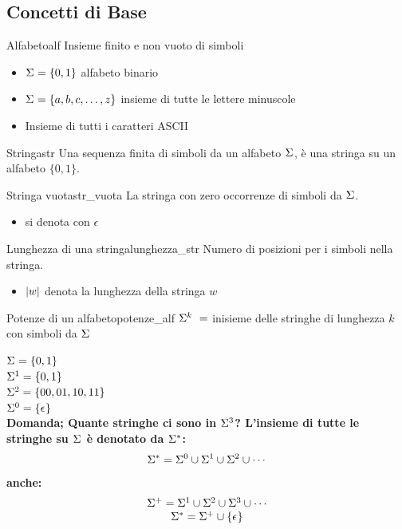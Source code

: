 \documentclass[11pt, a4paper]{article}
\begin{document}
\subsection{Concetti di Base}\label{sub:concetti_di_base} %
\begin{definition}{Alfabeto}{alf}
    Insieme finito e non vuoto di simboli
    \begin{itemize}
        \item $\Si = \{0, 1\}$ alfabeto binario
        \item $\Si = \{a, b, c, \dots, z\}$ insieme di tutte le lettere minuscole
        \item Insieme di tutti i caratteri ASCII
    \end{itemize}
\end{definition}
%
\begin{definition}{Stringa}{str}
    Una sequenza finita di simboli da un alfabeto $\Si$, è una stringa su un alfabeto $\{0, 1\}$.
\end{definition}
%
\begin{definition}{Stringa vuota}{str_vuota}
    La stringa con zero occorrenze di simboli da $\Si$.
    \begin{itemize}
        \item si denota con $\eps$
    \end{itemize}
\end{definition}
%
\begin{definition}{Lunghezza di una stringa}{lunghezza_str}
    Numero di posizioni per i simboli nella stringa.
    \begin{itemize}
        \item $\ab w$ denota la lunghezza della stringa $w$
    \end{itemize}
\end{definition}
%
\begin{definition}{Potenze di un alfabeto}{potenze_alf}
    $\Si[k] \ =$ inisieme delle stringhe di lunghezza $k$ con simboli da $\Si$
    \begin{example}{}{}
        $\Si = \{0, 1\}$ \\
        $\Si[1] = \{0, 1\}$ \\
        $\Si[2] = \{00, 01, 10, 11\}$ \\
        $\Si[0] = \{\eps\}$ \\
        \bf{Domanda}; Quante stringhe ci sono in $\Si[3]$?
        L'insieme di tutte le stringhe su $\Si$ è denotato da $\Si[*]$:
        \[
            \Si[*] = \Si[0] \cup \Si[1] \cup \Si[2] \cup \cdots
        \]
        anche:
        \[
            \begin{matrix}
                \Si[+] = \Si[1] \cup \Si[2] \cup \Si[3] \cup \cdots \\
                \Si[*] = \Si[+] \cup \{\eps\}
            \end{matrix}
        \]
    \end{example}
\end{definition}
\end{document}
